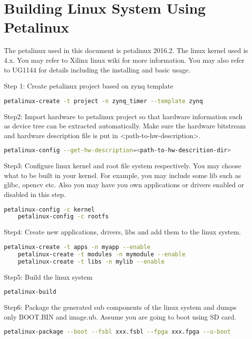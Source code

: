 \documentclass[12pt]{article} %
\begin{document}
\section{Building Linux System Using Petalinux}
The petalinux used in this document is petalinux 2016.2. The linux kernel used is 4.x. You may refer to 
Xilinx linux wiki for more information. You may also refer to UG1144 for details including 
the installing and basic usage.

Step 1: Create petalinux project based on zynq template 
\begin{lstlisting}[language=bash]
    petalinux-create -t project -n zynq_timer --template zynq
\end{lstlisting}

Step2: Import hardware to petalinux project so that hardware information such as device 
tree can be extracted automatically. Make sure the hardware bitstream and hardware 
description file is put in <path-to-hw-description>.
\begin{lstlisting}[language=bash]
    petalinux-config --get-hw-description=<path-to-hw-descrition-dir>
\end{lstlisting}

Step3: Configure linux kernel and root file system respectively.
You may choose what to be built in your kernel. For example, you may include some lib such as glibc, opencv etc.
Also you may have you own applications or drivers enabled or disabled in this step.
\begin{lstlisting}[language=bash]
    petalinux-config -c kernel 
    petalinux-config -c rootfs
\end{lstlisting}

Step4: Create new applications, drivers, libs and add them to the linux system.
\begin{lstlisting}[language=bash]
    petalinux-create -t apps -n myapp --enable
    petalinux-create -t modules -n mymodule --enable
    petalinux-create -t libs -n mylib --enable
\end{lstlisting}

Step5: Build the linux system
\begin{lstlisting}[language=bash]
    petalinux-build
\end{lstlisting}


Step6: Package the generated sub components of the linux system and dumps only BOOT.BIN and image.ub.
Assume you are going to boot using SD card.
\begin{lstlisting}[language=bash]
    petalinux-package --boot --fsbl xxx.fsbl --fpga xxx.fpga --u-boot
\end{lstlisting}
\end{document}
